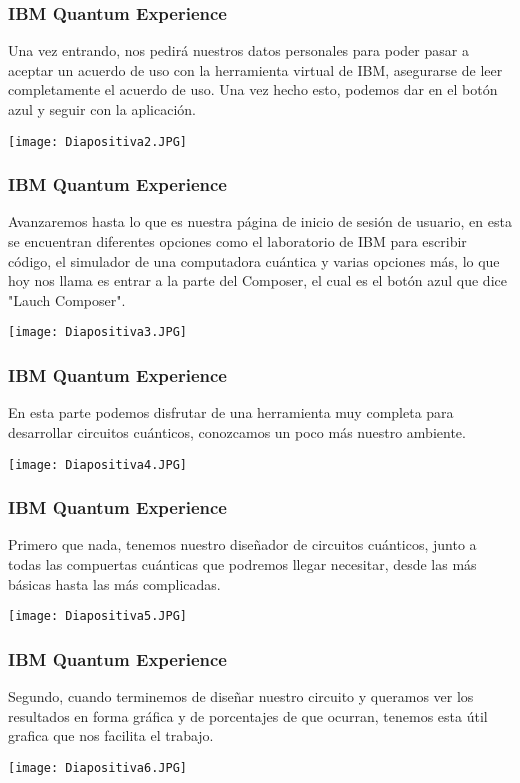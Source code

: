\documentclass[spanish]{beamer}
\begin{document}
 \newpage\begin{frame}
 \frametitle{IBM Quantum Experience} 
 \justify 
 Una vez entrando, nos pedirá nuestros datos personales para poder pasar a aceptar un acuerdo de uso con la herramienta virtual de IBM, asegurarse de leer completamente el acuerdo de uso. Una vez hecho esto, podemos dar en el botón azul y seguir con la aplicación.
 
 \centering\texttt{[image: Diapositiva2.JPG]}
 \end{frame}
 
 \newpage\justify \begin{frame}
 \frametitle{IBM Quantum Experience} 
 Avanzaremos hasta lo que es nuestra página de inicio de sesión de usuario, en esta se encuentran diferentes opciones como el laboratorio de IBM para escribir código, el simulador de una computadora cuántica y varias opciones más, lo que hoy nos llama es entrar a la parte del Composer, el cual es el botón azul que dice "Lauch Composer".
 
 \centering\texttt{[image: Diapositiva3.JPG]}
 \end{frame}
 
  \newpage\justify \begin{frame}
 \frametitle{IBM Quantum Experience} 
En esta parte podemos disfrutar de una herramienta muy completa para desarrollar circuitos cuánticos, conozcamos un poco más nuestro ambiente. 
 
 \centering\texttt{[image: Diapositiva4.JPG]}
 \end{frame}
 
  \newpage\justify \begin{frame}
 \frametitle{IBM Quantum Experience} 
 Primero que nada, tenemos nuestro diseñador de circuitos cuánticos, junto a todas las compuertas cuánticas que podremos llegar necesitar, desde las más básicas hasta las más complicadas.
 
 \centering\texttt{[image: Diapositiva5.JPG]}
 \end{frame}
 
  \newpage\justify \begin{frame}
 \frametitle{IBM Quantum Experience} 
 Segundo, cuando terminemos de diseñar nuestro circuito y queramos ver los resultados en forma gráfica y de porcentajes de que ocurran, tenemos esta útil grafica que nos facilita el trabajo.
 
 \centering\texttt{[image: Diapositiva6.JPG]}
 \end{frame}
 
\end{document}
